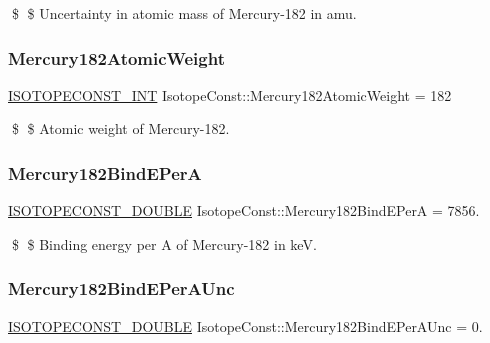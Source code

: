 \$ \$ Uncertainty in atomic mass of Mercury-\/182 in amu. \mbox{\label{group___isotope_const-_mercury-_hg182_gaeb07128796cdf58edf21590749c646d0}} 
\subsubsection{\texorpdfstring{Mercury182\+Atomic\+Weight}{Mercury182AtomicWeight}}
{\footnotesize\ttfamily \mbox{\hyperlink{group___isotope_const-_macros_ga5f18360b3e99483a35c32d789e62621c}{I\+S\+O\+T\+O\+P\+E\+C\+O\+N\+S\+T\+\_\+\+I\+NT}} Isotope\+Const\+::\+Mercury182\+Atomic\+Weight = 182}

\$ \$ Atomic weight of Mercury-\/182. \mbox{\label{group___isotope_const-_mercury-_hg182_gab57e8141c6fdf7bc332462daa71e8abd}} 
\subsubsection{\texorpdfstring{Mercury182\+Bind\+E\+PerA}{Mercury182BindEPerA}}
{\footnotesize\ttfamily \mbox{\hyperlink{group___isotope_const-_macros_ga8f45a7272ce02c0b4c65c44636ed719a}{I\+S\+O\+T\+O\+P\+E\+C\+O\+N\+S\+T\+\_\+\+D\+O\+U\+B\+LE}} Isotope\+Const\+::\+Mercury182\+Bind\+E\+PerA = 7856.}

\$ \$ Binding energy per A of Mercury-\/182 in keV. \mbox{\label{group___isotope_const-_mercury-_hg182_ga36c3668cac10907ba8218a86cbf4a34f}} 
\subsubsection{\texorpdfstring{Mercury182\+Bind\+E\+Per\+A\+Unc}{Mercury182BindEPerAUnc}}
{\footnotesize\ttfamily \mbox{\hyperlink{group___isotope_const-_macros_ga8f45a7272ce02c0b4c65c44636ed719a}{I\+S\+O\+T\+O\+P\+E\+C\+O\+N\+S\+T\+\_\+\+D\+O\+U\+B\+LE}} Isotope\+Const\+::\+Mercury182\+Bind\+E\+Per\+A\+Unc = 0.}

